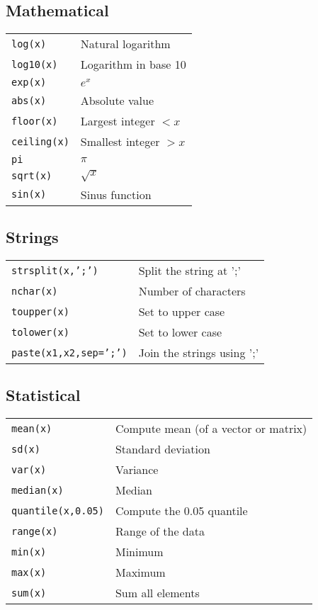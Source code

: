 \subsection{Mathematical}

\begin{tabular}{p{2.5cm} p{10cm}} 
{\tt log(x)} & Natural logarithm\\
{\tt log10(x)} & Logarithm in base 10\\
{\tt exp(x)} & $e^x$\\
{\tt abs(x)} & Absolute value\\
{\tt floor(x)} & Largest integer $<x$\\
{\tt ceiling(x)} & Smallest integer $>x$\\
{\tt pi} & $\pi$\\
{\tt sqrt(x)} & $\sqrt{x}$\\
{\tt sin(x)} & Sinus function\\
\end{tabular}

\subsection{Strings}

\begin{tabular}{p{4.5cm} p{8cm}}
{\tt strsplit(x,';')} & Split the string at ';' \\
{\tt nchar(x)} & Number of characters\\
{\tt toupper(x)} & Set to upper case\\
{\tt tolower(x)} & Set to lower case\\
{\tt paste(x1,x2,sep=';')} & Join the strings using ';'\\
\end{tabular}

\subsection{Statistical}

\begin{tabular}{p{3.5cm} p{9.5cm}}
	{\tt mean(x)} & Compute mean (of a vector or matrix)\\
	{\tt sd(x)} & Standard deviation\\
	{\tt var(x)} & Variance\\
	{\tt median(x)} & Median\\
	{\tt quantile(x,0.05)} & Compute the 0.05 quantile\\
	{\tt range(x)} & Range of the data\\
	{\tt min(x)} & Minimum\\
	{\tt max(x)} & Maximum\\
	{\tt sum(x)} & Sum all elements\\
\end{tabular}

